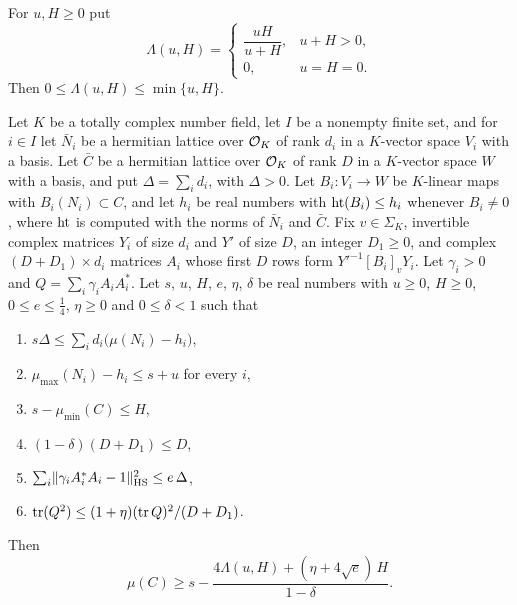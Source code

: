 For $u,H\ge0$ put
\[
\Lambda(u,H)=
\begin{cases}
\dfrac{uH}{u+H},&u+H>0,\\
0,&u=H=0.
\end{cases}
\]
Then $0\le\Lambda(u,H)\le\min\{u,H\}$.

\begin{theorem}\label{r3:frame}
Let $K$ be a totally complex number field, let $I$ be a nonempty finite set, and for $i\in I$ let $\bar N_i$ be a hermitian lattice over $\mathcal O_K$ of rank $d_i$ in a $K$-vector space $V_i$ with a basis. Let $\bar C$ be a hermitian lattice over $\mathcal O_K$ of rank $D$ in a $K$-vector space $W$ with a basis, and put $\Delta=\sum_id_i$, with $\Delta>0$. Let $B_i\colon V_i\to W$ be $K$-linear maps with $B_i(N_i)\subset C$, and let $h_i$ be real numbers with $\operatorname{ht}(B_i)\le h_i$ whenever $B_i\ne0$, where $\operatorname{ht}$ is computed with the norms of $\bar N_i$ and $\bar C$. Fix $v\in\Sigma_K$, invertible complex matrices $Y_i$ of size $d_i$ and $Y'$ of size $D$, an integer $D_1\ge0$, and complex $(D+D_1)\times d_i$ matrices $A_i$ whose first $D$ rows form $Y'^{-1}[B_i]_vY_i$. Let $\gamma_i>0$ and $Q=\sum_i\gamma_iA_iA_i^*$. Let $s$, $u$, $H$, $e$, $\eta$, $\delta$ be real numbers with $u\ge0$, $H\ge0$, $0\le e\le\frac14$, $\eta\ge0$ and $0\le\delta<1$ such that
\begin{enumerate}
\item[(i)] $s\Delta\le\sum_id_i\big(\mu(N_i)-h_i\big)$,
\item[(ii)] $\mu_{\max}(N_i)-h_i\le s+u$ for every $i$,
\item[(iii)] $s-\mu_{\min}(C)\le H$,
\item[(iv)] $(1-\delta)(D+D_1)\le D$,
\item[(v)] $\sum_i\lVert\gamma_iA_i^*A_i-1\rVert_{\mathrm{HS}}^2\le e\,\Delta$,
\item[(vi)] $\operatorname{tr}(Q^2)\le(1+\eta)(\operatorname{tr} Q)^2/(D+D_1)$.
\end{enumerate}
Then
\[
\mu(C)\ge s-\frac{4\Lambda(u,H)+(\eta+4\sqrt e)\,H}{1-\delta}.
\]
\end{theorem}

